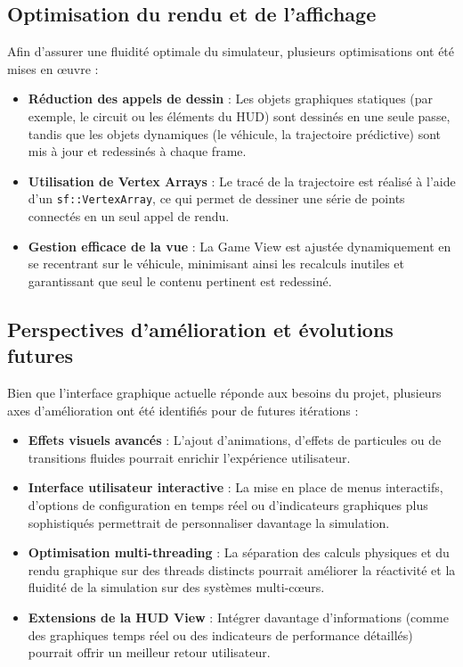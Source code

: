 \subsection{Optimisation du rendu et de l'affichage}\label{subsec:optimisation-du-rendu-et-de-l-affichage}
Afin d'assurer une fluidité optimale du simulateur, plusieurs optimisations ont été mises en œuvre :
\begin{itemize}
    \item \textbf{Réduction des appels de dessin} : Les objets graphiques statiques (par exemple, le circuit ou les éléments du HUD) sont dessinés en une seule passe, tandis que les objets dynamiques (le véhicule, la trajectoire prédictive) sont mis à jour et redessinés à chaque frame.
    \item \textbf{Utilisation de Vertex Arrays} : Le tracé de la trajectoire est réalisé à l'aide d'un \texttt{sf::VertexArray}, ce qui permet de dessiner une série de points connectés en un seul appel de rendu.
    \item \textbf{Gestion efficace de la vue} : La Game View est ajustée dynamiquement en se recentrant sur le véhicule, minimisant ainsi les recalculs inutiles et garantissant que seul le contenu pertinent est redessiné.
\end{itemize}

\subsection{Perspectives d'amélioration et évolutions futures}\label{subsec:perspectives-d-evolution}
Bien que l'interface graphique actuelle réponde aux besoins du projet, plusieurs axes d'amélioration ont été identifiés pour de futures itérations :
\begin{itemize}
    \item \textbf{Effets visuels avancés} : L'ajout d'animations, d'effets de particules ou de transitions fluides pourrait enrichir l'expérience utilisateur.
    \item \textbf{Interface utilisateur interactive} : La mise en place de menus interactifs, d'options de configuration en temps réel ou d'indicateurs graphiques plus sophistiqués permettrait de personnaliser davantage la simulation.
    \item \textbf{Optimisation multi-threading} : La séparation des calculs physiques et du rendu graphique sur des threads distincts pourrait améliorer la réactivité et la fluidité de la simulation sur des systèmes multi-cœurs.
    \item \textbf{Extensions de la HUD View} : Intégrer davantage d'informations (comme des graphiques temps réel ou des indicateurs de performance détaillés) pourrait offrir un meilleur retour utilisateur.
\end{itemize}

